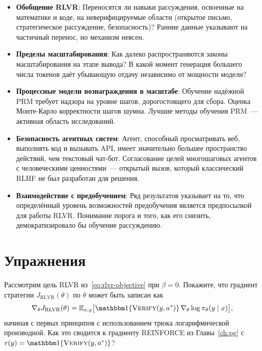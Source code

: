 \begin{itemize}[leftmargin=*]
\item \textbf{Обобщение RLVR}: Переносятся ли навыки рассуждения, освоенные
  на математике и коде, на неверифицируемые области
  (открытое письмо, стратегическое рассуждение, безопасность)? Ранние данные
  указывают на частичный перенос, но механизм неясен.

\item \textbf{Пределы масштабирования}: Как далеко распространяются законы масштабирования
  на этапе вывода? В какой момент генерация большего числа токенов даёт убывающую
  отдачу независимо от мощности модели?

\item \textbf{Процессные модели вознаграждения в масштабе}: Обучение надёжной
  PRM требует надзора на уровне шагов, дорогостоящего для сбора.
  Оценка Монте-Карло корректности шагов шумна. Лучшие методы
  обучения PRM~--- активная область исследований.

\item \textbf{Безопасность агентных систем}: Агент, способный просматривать
  веб, выполнять код и вызывать API, имеет значительно большее пространство действий,
  чем текстовый чат-бот. Согласование целей
  многошаговых агентов с человеческими ценностями~--- открытый вызов, который
  классический RLHF не был разработан для решения.

\item \textbf{Взаимодействие с предобучением}: Ряд результатов указывает на то,
  что определённый уровень возможностей предобучения является предпосылкой
  для работы RLVR. Понимание порога и того, как его снизить,
  демократизировало бы обучение рассуждению.
\end{itemize}

\section*{Упражнения}

\begin{exercise}
\label{ex:rlvr-gradient}
Рассмотрим цель RLVR из~\eqref{eq:rlvr-objective} при $\beta = 0$.
Покажите, что градиент стратегии $J_{\mathrm{RLVR}}(\theta)$ по
$\theta$ может быть записан как
\[
\nabla_\theta J_{\mathrm{RLVR}}(\theta)
  = \E_{x, y}\bigl[\ind\{\textsc{Verify}(y, a^*)\}\,
    \nabla_\theta \log \pi_\theta(y \mid x)\bigr],
\]
начиная с первых принципов с использованием трюка логарифмической производной. Как
это сводится к градиенту REINFORCE из
Главы~\ref{ch:pg} с $r(y) = \ind\{\textsc{Verify}(y,a^*)\}$?
\end{exercise}


